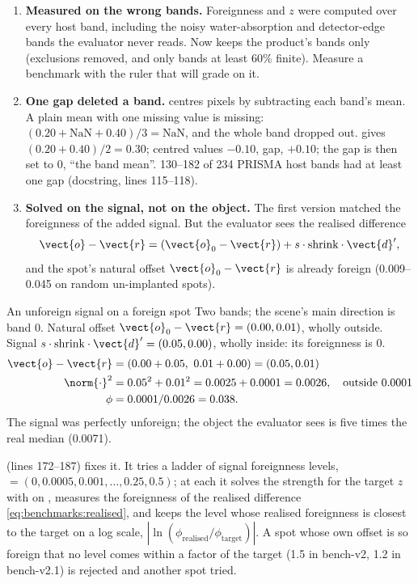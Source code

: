 \begin{enumerate}
\item \textbf{Measured on the wrong bands.} Foreignness and $z$ were computed over every host band, including the noisy
water-absorption and detector-edge bands the evaluator never reads. Now  keeps the product's
bands only (exclusions removed, and only bands at least 60\% finite). Measure a benchmark with the ruler that will
grade on it.
\item \textbf{One gap deleted a band.}  centres pixels by subtracting each band's mean. A
plain mean with one missing value is missing: $(0.20 + \text{NaN} + 0.40)/3 = \text{NaN}$, and the whole band dropped
out.  gives $(0.20 + 0.40)/2 = 0.30$; centred values $-0.10$, gap, $+0.10$; the gap is then set to 0,
``the band mean''. 130--182 of 234 PRISMA host bands had at least one gap (docstring, lines 115--118).
\item \textbf{Solved on the signal, not on the object.} The first version matched the foreignness of the added signal.
But the evaluator sees the realised difference
\begin{equation}\label{eq:benchmarks:realised}
\vect{o} - \vect{r} = (\vect{o}_0 - \vect{r}) + s \cdot \text{shrink} \cdot \vect{d}',
\end{equation}
and the spot's natural offset $\vect{o}_0 - \vect{r}$ is already foreign (0.009--0.045 on random un-implanted spots).
\end{enumerate}

\begin{worked}[label={we:benchmarks:realised}]{An unforeign signal on a foreign spot}
Two bands; the scene's main direction is band 0. Natural offset $\vect{o}_0 - \vect{r} = (0.00, 0.01)$, wholly outside.
Signal $s \cdot \text{shrink} \cdot \vect{d}' = (0.05, 0.00)$, wholly inside: its foreignness is 0.
\begin{align*}
\vect{o} - \vect{r} &= (0.00 + 0.05,\ 0.01 + 0.00) = (0.05, 0.01)\\
\norm{\cdot}^2 &= 0.05^2 + 0.01^2 = 0.0025 + 0.0001 = 0.0026, \quad \text{outside } 0.0001\\
\phi &= 0.0001 / 0.0026 = 0.038.
\end{align*}
The signal was perfectly unforeign; the object the evaluator sees is five times the real median (0.0071).
\end{worked}

 (lines 172--187) fixes it. It tries a ladder of signal foreignness levels,
 $= (0, 0.0005, 0.001, \ldots, 0.25, 0.5)$; at each it solves the strength for the target $z$
with  on , measures the foreignness of the realised difference
\cref{eq:benchmarks:realised}, and keeps the level whose realised foreignness is closest to the target on a log scale,
$|\ln(\phi_{\text{realised}} / \phi_{\text{target}})|$. A spot whose own offset is so foreign that no level comes
within a factor  of the target (1.5 in bench-v2, 1.2 in bench-v2.1) is rejected and another spot tried.

